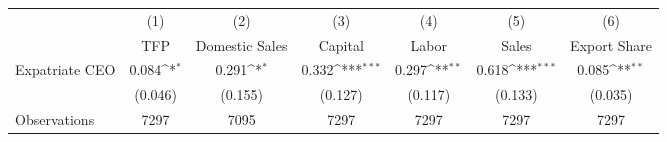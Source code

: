 {
\def\sym#1{\ifmmode^{#1}\else\(^{#1}\)\fi}
\begin{tabular}{l*{6}{c}}
\hline\hline
                    &\multicolumn{1}{c}{(1)}&\multicolumn{1}{c}{(2)}&\multicolumn{1}{c}{(3)}&\multicolumn{1}{c}{(4)}&\multicolumn{1}{c}{(5)}&\multicolumn{1}{c}{(6)}\\
                    &\multicolumn{1}{c}{TFP}&\multicolumn{1}{c}{Domestic Sales}&\multicolumn{1}{c}{Capital}&\multicolumn{1}{c}{Labor}&\multicolumn{1}{c}{Sales}&\multicolumn{1}{c}{Export Share}\\
\hline
Expatriate CEO      &       0.084\sym{*}  &       0.291\sym{*}  &       0.332\sym{***}&       0.297\sym{**} &       0.618\sym{***}&       0.085\sym{**} \\
                    &     (0.046)         &     (0.155)         &     (0.127)         &     (0.117)         &     (0.133)         &     (0.035)         \\
\hline
Observations        &        7297         &        7095         &        7297         &        7297         &        7297         &        7297         \\
\hline\hline
\end{tabular}
}
